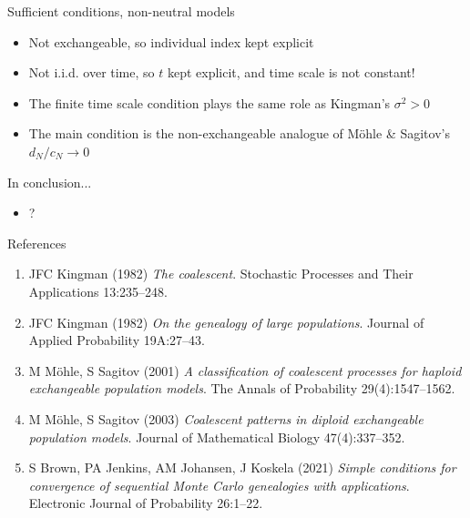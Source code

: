 \documentclass[aspectratio=169]{beamer}
\theoremstyle{definition}
\begin{document}
\begin{frame}{Sufficient conditions, non-neutral models}
\begin{itemize}
\item Not exchangeable, so individual index kept explicit
\item Not i.i.d. over time, so $t$ kept explicit, and time scale is not constant!
\item The finite time scale condition plays the same role as Kingman's $\sigma^2>0$ 
\item The main condition is the non-exchangeable analogue of M\"ohle \& Sagitov's $d_N/c_N \to 0$
\end{itemize}
\end{frame}


\begin{frame}{In conclusion...}
\begin{itemize}
\item ?
\end{itemize}
\end{frame}


\begin{frame}{References}
\begin{enumerate}
\item JFC Kingman (1982) \textit{The coalescent}. Stochastic Processes and Their Applications 13:235--248.
\item JFC Kingman (1982) \textit{On the genealogy of large populations}. Journal of Applied Probability 19A:27--43.
\item M M\"ohle, S Sagitov (2001) \textit{A classification of coalescent processes for haploid exchangeable population models}. The Annals of Probability 29(4):1547--1562.
\item M M\"ohle, S Sagitov (2003) \textit{Coalescent patterns in diploid exchangeable population models}. Journal of Mathematical Biology 47(4):337--352.
\item S Brown, PA Jenkins, AM Johansen, J Koskela (2021) \textit{Simple conditions for convergence of sequential Monte Carlo genealogies with applications}. Electronic Journal of Probability 26:1--22.
\end{enumerate}
\end{frame}
\end{document}
